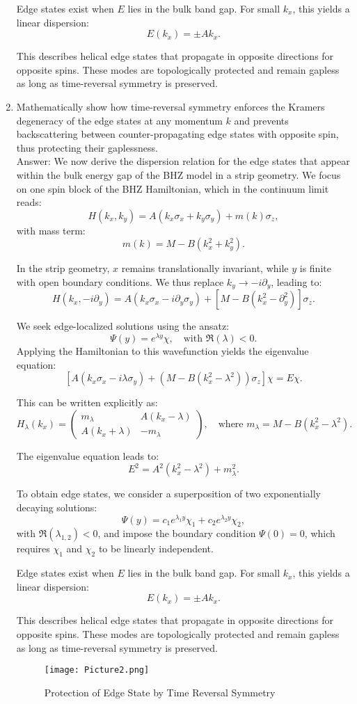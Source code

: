 \documentclass[a4paper,12pt]{article}
\begin{document}
\begin{enumerate}
Edge states exist when \( E \) lies in the bulk band gap. For small \( k_x \), this yields a linear dispersion:
\[
E(k_x) = \pm A k_x.
\]

This describes helical edge states that propagate in opposite directions for opposite spins. These modes are topologically protected and remain gapless as long as time-reversal symmetry is preserved.
    \item Mathematically show how time-reversal symmetry enforces the Kramers degeneracy of the edge states at any momentum $k$ and prevents backscattering between counter-propagating edge states with opposite spin, thus protecting their gaplessness.\\
Answer: We now derive the dispersion relation for the edge states that appear within the bulk energy gap of the BHZ model in a strip geometry. We focus on one spin block of the BHZ Hamiltonian, which in the continuum limit reads:
\[
H(k_x, k_y) = A(k_x \sigma_x + k_y \sigma_y) + m(k) \sigma_z,
\]
with mass term:
\[
m(k) = M - B(k_x^2 + k_y^2).
\]

In the strip geometry, \( x \) remains translationally invariant, while \( y \) is finite with open boundary conditions. We thus replace \( k_y \rightarrow -i\partial_y \), leading to:
\[
H(k_x, -i\partial_y) = A(k_x \sigma_x - i \partial_y \sigma_y) + [M - B(k_x^2 - \partial_y^2)] \sigma_z.
\]

We seek edge-localized solutions using the ansatz:
\[
\Psi(y) = e^{\lambda y} \chi, \quad \text{with } \Re(\lambda) < 0.
\]
Applying the Hamiltonian to this wavefunction yields the eigenvalue equation:
\[
\left[ A(k_x \sigma_x - i \lambda \sigma_y) + (M - B(k_x^2 - \lambda^2)) \sigma_z \right] \chi = E \chi.
\]

This can be written explicitly as:
\[
H_\lambda(k_x) =
\begin{pmatrix}
m_\lambda & A(k_x - \lambda) \\
A(k_x + \lambda) & -m_\lambda
\end{pmatrix}, \quad \text{where } m_\lambda = M - B(k_x^2 - \lambda^2).
\]

The eigenvalue equation leads to:
\[
E^2 = A^2(k_x^2 - \lambda^2) + m_\lambda^2.
\]

To obtain edge states, we consider a superposition of two exponentially decaying solutions:
\[
\Psi(y) = c_1 e^{\lambda_1 y} \chi_1 + c_2 e^{\lambda_2 y} \chi_2,
\]
with \( \Re(\lambda_{1,2}) < 0 \), and impose the boundary condition \( \Psi(0) = 0 \), which requires \( \chi_1 \) and \( \chi_2 \) to be linearly independent.

Edge states exist when \( E \) lies in the bulk band gap. For small \( k_x \), this yields a linear dispersion:
\[
E(k_x) = \pm A k_x.
\]

This describes helical edge states that propagate in opposite directions for opposite spins. These modes are topologically protected and remain gapless as long as time-reversal symmetry is preserved.
\begin{figure}[h]
\centering
\texttt{[image: Picture2.png]}
\caption{Protection of Edge State by Time Reversal Symmetry}
\label{fig;Picture2}
\end{figure}
\end{enumerate}
\end{document}
